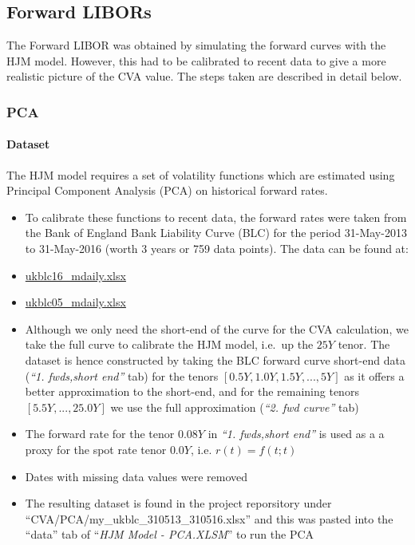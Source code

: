 \documentclass{article}
\begin{document}
    \subsection{Forward LIBORs}\label{forward-libors}

    The Forward LIBOR was obtained by simulating the forward curves with the
HJM model. However, this had to be calibrated to recent data to give a
more realistic picture of the CVA value. The steps taken are described
in detail below.

    \subsubsection{PCA}\label{pca}

    \paragraph{Dataset}\label{dataset}

    The HJM model requires a set of volatility functions which are estimated
using Principal Component Analysis (PCA) on historical forward rates.

\begin{itemize}
\item
  To calibrate these functions to recent data, the forward rates were
  taken from the Bank of England Bank Liability Curve (BLC) for the
  period 31-May-2013 to 31-May-2016 (worth 3 years or 759 data points).
  The data can be found at:
\item
  \href{http://www.bankofengland.co.uk/statistics/Documents/yieldcurve/ukblc16_mdaily.xlsx}{ukblc16\_mdaily.xlsx}
\item
  \href{http://www.bankofengland.co.uk/statistics/Documents/yieldcurve/ukblc05_mdaily.xlsx}{ukblc05\_mdaily.xlsx}
\item
  Although we only need the short-end of the curve for the CVA
  calculation, we take the full curve to calibrate the HJM model,
  i.e.~up the \(25Y\) tenor. The dataset is hence constructed by taking
  the BLC forward curve short-end data (\emph{``1. fwds,short end''}
  tab) for the tenors \([0.5Y, 1.0Y, 1.5Y, ..., 5Y]\) as it offers a
  better approximation to the short-end, and for the remaining tenors
  \([5.5Y, ..., 25.0Y]\) we use the full approximation (\emph{``2. fwd
  curve''} tab)
\item
  The forward rate for the tenor \(0.08Y\) in \emph{``1. fwds,short
  end''} is used as a a proxy for the spot rate tenor \(0.0Y\), i.e.
  \(r(t) = f(t;t)\)
\item
  Dates with missing data values were removed
\item
  The resulting dataset is found in the project reporsitory under
  ``CVA/PCA/my\_ukblc\_310513\_310516.xlsx'' and this was pasted into
  the ``data'' tab of ``\emph{HJM Model - PCA.XLSM}'' to run the PCA
\end{itemize}
\end{document}
